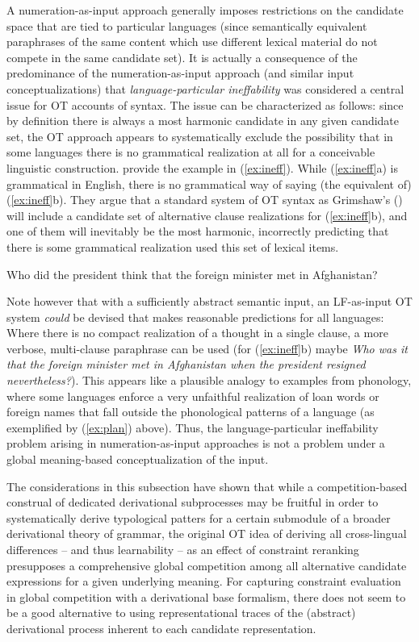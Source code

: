 \documentclass[output=paper,hidelinks]{langscibook}
\begin{document}
A numeration-as-input approach generally imposes restrictions on the candidate space that are tied to particular languages (since semantically equivalent paraphrases of the same content which use different lexical material do not compete in the same candidate set). 
It is actually a consequence of the predominance of the numeration-as-input approach (and similar input conceptualizations) that \emph{language-particular ineffability} was considered a central issue for OT accounts of syntax. The issue can be characterized as follows: since by definition there is always a most harmonic candidate in any given candidate set, the OT approach appears to systematically exclude the possibility that in some languages there is no grammatical realization at all for a conceivable linguistic construction.
\citet{FanselowFery} provide the example in (\ref{ex:ineff}). While (\ref{ex:ineff}a) is grammatical in English, there is no grammatical way of saying (the equivalent of)  (\ref{ex:ineff}b). They argue that a standard system of OT syntax as Grimshaw's (\citeyear{Grimshaw97}) will include a candidate set of alternative clause realizations for (\ref{ex:ineff}b), and one of them will inevitably be the most harmonic, incorrectly predicting that there is some grammatical realization used this set of lexical items.

\ea\label{ex:ineff}
  \ea Who did the president think that the foreign minister met in Afghanistan?
  \z
\z

\noindent
Note however that with a sufficiently abstract semantic input, an LF-as-input OT system \emph{could} be devised that makes reasonable predictions for all languages: Where there is no compact realization of a thought in a single clause, a more verbose, multi-clause paraphrase can be used (for (\ref{ex:ineff}b) maybe \emph{Who was it that the foreign minister met in Afghanistan when the president resigned nevertheless?}). This appears like a plausible analogy to examples from phonology, where some languages enforce a very unfaithful realization of loan words or foreign names that fall outside the phonological patterns of a language (as exemplified by (\ref{ex:plan}) above). Thus, the  language-particular ineffability problem arising in numeration-as-input approaches is not a problem under a global meaning-based conceptualization of the input.

The considerations in this subsection have shown that while a competition-based construal of dedicated derivational subprocesses may be fruitful in order to systematically derive typological patters for a certain submodule of a broader derivational theory of grammar, the original OT idea of deriving all cross-lingual differences -- and thus learnability -- as an effect of constraint reranking presupposes a comprehensive global competition among all alternative candidate expressions for a given underlying meaning. For capturing constraint evaluation in global competition with a derivational base formalism, there does not seem to be a good alternative to using representational traces of the (abstract) derivational process inherent to each candidate representation. 
\end{document}
